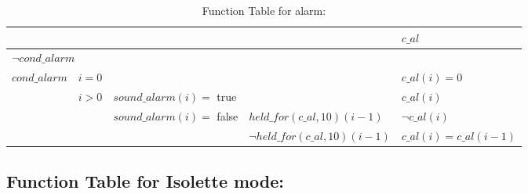 \documentclass[fontsize=12pt,paper=letter,twoside]{scrartcl}
\begin{document}
\begin{table}[htb!]
\centering
\label{my-label}
\begin{tabular}{llll|l|}
\cline{5-5}                                       &                                       &                                                               &                               & $c\_al$                 \\ \hline
\multicolumn{5}{|l|}{$\neg cond\_alarm$ \footnotemark                                                                                                                                                                             } \\ \hline
\multicolumn{1}{|l|}{\multirow{4}{*}{$cond\_alarm$}} & \multicolumn{1}{l|}{$i = 0$}            & \multicolumn{1}{l|}{}                                         &                               & $c\_al(i) = 0$          \\ \cline{2-5}
\multicolumn{1}{|l|}{}                             & \multicolumn{1}{l|}{$i > 0$} & \multicolumn{2}{l|}{$sound\_alarm(i) =$ true}                                                   & $c\_al(i)$              \\ \cline{2-5}
\multicolumn{1}{|l|}{}                             & \multicolumn{1}{l|}{}                 & \multicolumn{1}{l|}{\multirow{2}{*}{$sound\_alarm(i) =$ false}} & $held\_for(c\_al, 10)(i-1)$     & $\neg c\_al(i)$          \\ \cline{2-2} \cline{4-5}
\multicolumn{1}{|l|}{}                             & \multicolumn{1}{l|}{}                 & \multicolumn{1}{l|}{}                                         & $\neg held\_for(c\_al, 10)(i-1)$ & $c\_al(i) = c\_al(i-1)$ \\ \hline
\end{tabular}
\caption{Function Table for alarm: }
\end{table}

\FloatBarrier
\subsection{Function Table for Isolette mode: }
\FloatBarrier
\end{document}
